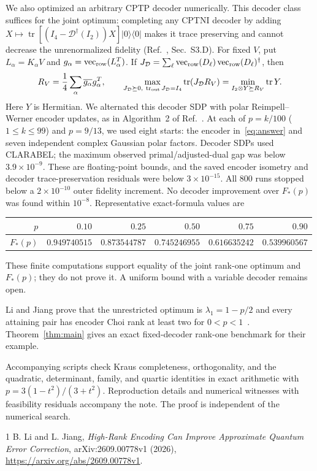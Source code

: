 \documentclass[11pt]{article}
\newcommand{\ket}[1]{\lvert #1\rangle}
\newcommand{\bra}[1]{\langle #1\rvert}
\newcommand{\tr}{\operatorname{tr}}
\newcommand{\D}{\mathcal D}
\begin{document}
We also optimized an arbitrary CPTP decoder numerically. This decoder class
suffices for the joint optimum: completing any CPTNI decoder by adding
$X\mapsto\tr[(I_4-\D^\dagger(I_2))X]\ket0\bra0$ makes it trace preserving
and cannot decrease the unrenormalized fidelity
(Ref.~\cite{LiJiang}, Sec.~S3.D).
For fixed $V$, put $L_\alpha=K_\alpha V$ and
$g_\alpha=\operatorname{vec}_{\rm row}(L_\alpha^T)$.
If $J_\D=\sum_\ell\operatorname{vec}_{\rm row}(D_\ell)
\operatorname{vec}_{\rm row}(D_\ell)^\dagger$, then
\begin{equation}
 R_V=\frac14\sum_\alpha\overline{g_\alpha}g_\alpha^T,\qquad
 \max_{J_\D\succeq0,\ \tr_{\rm out}J_\D=I_4}\tr(J_\D R_V)
 =\min_{I_2\otimes Y\succeq R_V}\tr Y.\label{eq:sdp}
\end{equation}
Here $Y$ is Hermitian. We alternated this decoder SDP with polar
Reimpell--Werner encoder updates, as in Algorithm~2 of Ref.~\cite{LiJiang}.
At each of $p=k/100$ ($1\leq k\leq99$) and $p=9/13$, we used eight starts:
the encoder in~\eqref{eq:answer} and seven independent complex Gaussian
polar factors.
Decoder SDPs used CLARABEL; the maximum observed primal/adjusted-dual
gap was below $3.9\times10^{-9}$. These are floating-point bounds, and
the saved encoder isometry and decoder trace-preservation residuals
were below $3\times10^{-15}$. All 800 runs stopped below a
$2\times10^{-10}$ outer fidelity increment. No decoder improvement over
$F_*(p)$ was found within $10^{-8}$. Representative exact-formula values are
\begin{center}
\begin{tabular}{rrrrrr}
\toprule
$p$ & $0.10$ & $0.25$ & $0.50$ & $0.75$ & $0.90$\\
\midrule
$F_*(p)$ & $0.949740515$ & $0.873544787$ & $0.745246955$ & $0.616635242$ & $0.539960567$\\
\bottomrule
\end{tabular}
\end{center}
These finite computations support equality of the joint rank-one optimum
and $F_*(p)$; they do not prove it. A uniform bound with a variable decoder
remains open.

Li and Jiang prove that the unrestricted optimum is $\lambda_1=1-p/2$
and every attaining pair has encoder Choi rank at least two for
$0<p<1$~\cite{LiJiang}. Theorem~\ref{thm:main} gives an exact
fixed-decoder rank-one benchmark for their example.

Accompanying scripts check Kraus completeness, orthogonality, and the
quadratic, determinant, family, and quartic identities in exact arithmetic
with $p=3(1-t^2)/(3+t^2)$. Reproduction details and numerical witnesses
with feasibility residuals accompany the note. The proof is independent
of the numerical search.

\begin{thebibliography}{1}
B. Li and L. Jiang,
\emph{High-Rank Encoding Can Improve Approximate Quantum Error Correction},
arXiv:2609.00778v1 (2026),
\url{https://arxiv.org/abs/2609.00778v1}.
\end{thebibliography}
\end{document}

